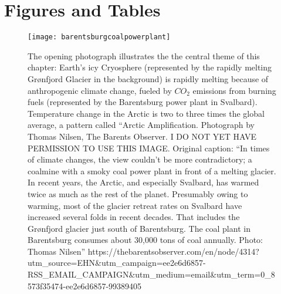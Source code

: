 \documentclass[amstex,12pt]{book}
\begin{document}
\section{Figures and Tables}   \label{Figures}

\begin{figure}[p]
\centering
\texttt{[image: barentsburgcoalpowerplant]}%
\caption{The opening photograph illustrates the the central theme of this chapter: Earth's icy Cryosphere (represented by the rapidly melting Gr\o nfjord Glacier in the background) is rapidly melting because of anthropogenic climate change, fueled by $CO_2$ emissions from burning  fuels (represented by the Barentsburg power plant in Svalbard). Temperature change in the Arctic is two to three times the global average, a pattern called ``Arctic Amplification. Photograph by Thomas Nilsen, The Barents Observer. I DO NOT YET HAVE PERMISSION TO USE THIS IMAGE. Original caption: ``In times of climate changes, the view couldn't be more contradictory; a coalmine with a smoky coal power plant in front of a melting glacier. In recent years, the Arctic, and especially Svalbard, has warmed twice as much as the rest of the planet. Presumably owing to warming, most of the glacier retreat rates on Svalbard have increased several folds in recent decades. That includes the Grønfjord glacier just south of Barentsburg. The coal plant in Barentsburg consumes about 30,000 tons of coal annually.  Photo: Thomas Nilsen'' https://thebarentsobserver.com/en/node/4314?utm\_source=EHN\&utm\_campaign=ee2e6d6857-RSS\_EMAIL\_CAMPAIGN\&utm\_medium=email\&utm\_term=0\_8573f35474-ee2e6d6857-99389405} 
\label{fig:Barentsburg}
\end{figure}
\end{document}
